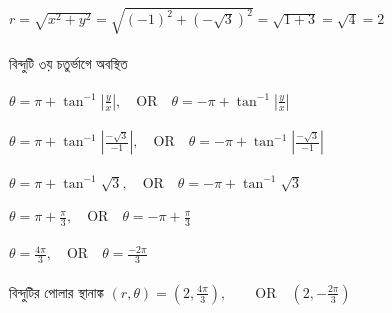 \documentclass{article}
\begin{document}
$r=\sqrt{x^2+y^2}=\sqrt{(-1)^2+(-\sqrt{3})^2}=\sqrt{1+3}=\sqrt{4}=2$\\
\\
বিন্দুটি ৩য় চতুর্ভাগে অবস্থিত \\
\\
$\theta= \pi+\tan^{-1}|\frac{y}{x}|,\quad \mbox{OR}\quad \theta= -\pi+\tan^{-1}|\frac{y}{x}| $\\
\\
$\theta= \pi+\tan^{-1}|\frac{-\sqrt{3}}{-1}|,\quad \mbox{OR}\quad \theta= -\pi+\tan^{-1}|\frac{-\sqrt{3}}{-1}| $\\
\\
$\theta= \pi+\tan^{-1}\sqrt{3},\quad \mbox{OR}\quad \theta= -\pi+\tan^{-1}\sqrt{3} $\\
\\
$\theta= \pi+\frac{\pi}{3},\quad \mbox{OR}\quad \theta= -\pi+\frac{\pi}{3} $\\
\\
$\theta=\frac{4\pi}{3},\quad \mbox{OR}\quad \theta= \frac{-2\pi}{3} $\\
\\
বিন্দুটির পোলার স্থানাঙ্ক $(r,\theta)=(2,\frac{4\pi}{3}),\qquad \mbox{OR}\quad (2,-\frac{2\pi}{3})$\\
\end{document}
